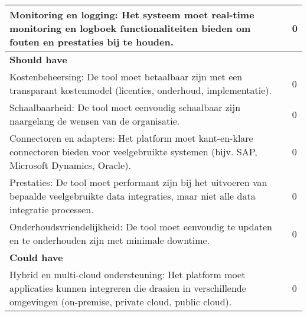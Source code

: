 \begin{landscape}
\begin{table}[H]
{\begin{tabular}{|ll|}
\multicolumn{1}{|l|}{Monitoring en logging: Het systeem moet real-time monitoring en logboek functionaliteiten bieden om fouten en prestaties bij te houden.}                                                              & 0                            \\ \hline
\textbf{Should have}                                                                                                                                                                                                       &                              \\ \hline
\multicolumn{1}{|l|}{Kostenbeheersing: De tool moet betaalbaar zijn met een transparant kostenmodel (licenties, onderhoud, implementatie).}                                                                                & 0                            \\ \hline
\multicolumn{1}{|l|}{Schaalbaarheid: De tool moet eenvoudig schaalbaar zijn naargelang de wensen van de organisatie.}                                                                                                      & 0                            \\ \hline
\multicolumn{1}{|l|}{Connectoren en adapters: Het platform moet kant-en-klare connectoren bieden voor veelgebruikte systemen (bijv. SAP, Microsoft Dynamics, Oracle).}                                                     & 0                            \\ \hline
\multicolumn{1}{|l|}{Prestaties: De tool moet performant zijn bij het uitvoeren van bepaalde veelgebruikte data integraties, maar niet alle data integratie processen.}                                                    & 0                            \\ \hline
\multicolumn{1}{|l|}{Onderhoudsvriendelijkheid: De tool moet eenvoudig te updaten en te onderhouden zijn met minimale downtime.}                                                                                           & 0                            \\ \hline
\textbf{Could have}                                                                                                                                                                                                        &                              \\ \hline
\multicolumn{1}{|l|}{Hybrid en multi-cloud ondersteuning: Het platform moet applicaties kunnen integreren die draaien in verschillende omgevingen (on-premise, private cloud, public cloud).}                              & 0                            \\ \hline

\end{tabular}}
\end{table}
\end{landscape}
